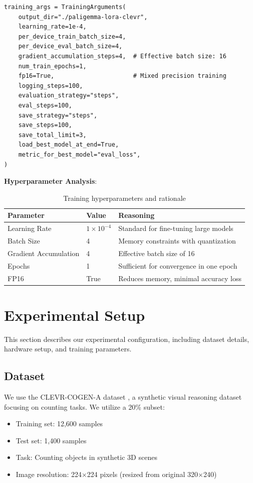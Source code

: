 \documentclass[conference]{IEEEtran}
\begin{document}
\begin{lstlisting}[caption={Training Configuration}]
training_args = TrainingArguments(
    output_dir="./paligemma-lora-clevr",
    learning_rate=1e-4,
    per_device_train_batch_size=4,
    per_device_eval_batch_size=4,
    gradient_accumulation_steps=4,  # Effective batch size: 16
    num_train_epochs=1,
    fp16=True,                      # Mixed precision training
    logging_steps=100,
    evaluation_strategy="steps",
    eval_steps=100,
    save_strategy="steps",
    save_steps=100,
    save_total_limit=3,
    load_best_model_at_end=True,
    metric_for_best_model="eval_loss",
)
\end{lstlisting}

\textbf{Hyperparameter Analysis}:

\begin{table}[H]
\centering
\begin{tabular}{l|l|l}
\toprule
\textbf{Parameter} & \textbf{Value} & \textbf{Reasoning} \\
\midrule
Learning Rate & $1 \times 10^{-4}$ & Standard for fine-tuning large models \\
Batch Size & 4 & Memory constraints with quantization \\
Gradient Accumulation & 4 & Effective batch size of 16 \\
Epochs & 1 & Sufficient for convergence in one epoch \\
FP16 & True & Reduces memory, minimal accuracy loss \\
\bottomrule
\end{tabular}
\caption{Training hyperparameters and rationale}
\end{table}

\section{Experimental Setup}

This section describes our experimental configuration, including dataset details, hardware setup, and training parameters.

\subsection{Dataset}

We use the CLEVR-COGEN-A dataset \cite{clevr2017}, a synthetic visual reasoning dataset focusing on counting tasks. We utilize a 20\% subset:
\begin{itemize}
    \item Training set: 12,600 samples
    \item Test set: 1,400 samples
    \item Task: Counting objects in synthetic 3D scenes
    \item Image resolution: 224×224 pixels (resized from original 320×240)
\end{itemize}
\end{document}
